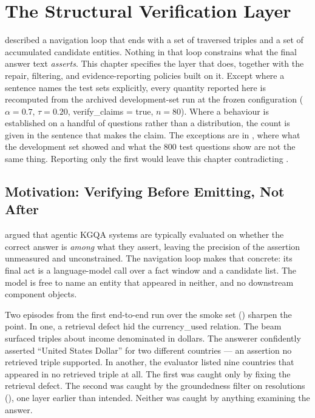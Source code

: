 \chapter{The Structural Verification Layer}\label{ch:verification}

 described a navigation loop that ends with a set of
traversed triples and a set of accumulated candidate entities. Nothing in that
loop constrains what the final answer text \emph{asserts}. This chapter
specifies the layer that does, together with the repair, filtering, and
evidence-reporting policies built on it. Except where a sentence names the test
sets explicitly, every quantity reported here is recomputed from the archived
development-set run at the frozen configuration ($\alpha = 0.7$, $\tau = 0.20$,
\textsf{verify\_claims} = true, $n = 80$). Where a behaviour is established on
a handful of questions rather than a distribution, the count is given in the
sentence that makes the claim. The exceptions are in , where
what the development set showed and what the $800$ test questions show are not
the same thing. Reporting only the first would leave this chapter
contradicting .

\section{Motivation: Verifying Before Emitting, Not
After}\label{sec:verify-motivation}

 argued that agentic KGQA systems are typically evaluated
on whether the correct answer is \emph{among} what they assert, leaving
the precision of the assertion unmeasured and
unconstrained. The navigation loop makes that concrete: its final act is a
language-model call over a fact window and a candidate list. The model is free
to name an entity that appeared in neither, and no downstream component objects.

Two episodes from the first end-to-end run over the smoke set
() sharpen the point. In one, a retrieval defect hid
the \textsf{currency\_used} relation. The beam surfaced triples about income
denominated in dollars. The answerer confidently asserted ``United States
Dollar'' for two different countries --- an assertion no retrieved triple
supported. In another, the evaluator listed nine countries that appeared in no
retrieved triple at all. The first was caught only by fixing the retrieval
defect. The second was caught by the groundedness filter on resolutions
(), one layer earlier than intended. Neither was
caught by anything examining the answer.

